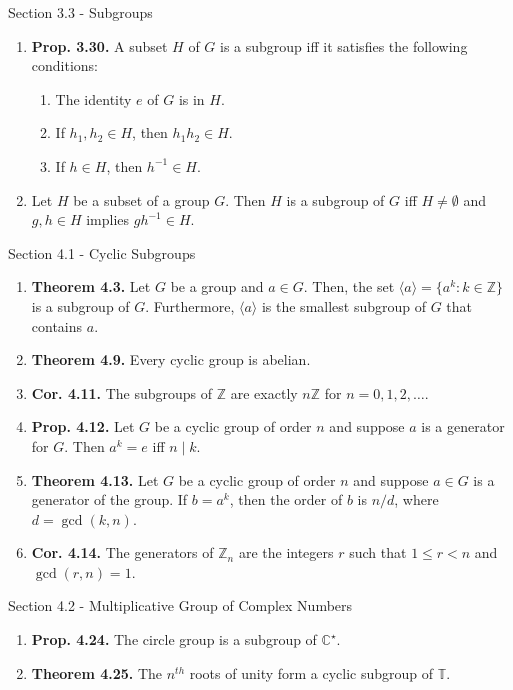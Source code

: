 \documentclass[12pt]{article}
\theoremstyle{definition}
\theoremstyle{named}
\begin{document}
\begin{section}{Section 3.3 - Subgroups}
    \begin{enumerate}
        \item \textbf{Prop. 3.30. } A subset $H$ of $G$ is a subgroup iff it satisfies the following conditions: 
        \begin{enumerate}
            \item The identity $e$ of $G$ is in $H$. 
            \item If $h_1,h_2 \in H$, then $h_1h_2 \in H$. 
            \item If $h \in H$, then $h^{-1} \in H$. 
        \end{enumerate}
        \item Let $H$ be a subset of a group $G$. Then $H$ is a subgroup of $G$ iff $H \neq \emptyset$ and $g,h \in H$ implies $gh^{-1} \in H$. 
    \end{enumerate}
\end{section}

\begin{section}{Section 4.1 - Cyclic Subgroups}
    \begin{enumerate}
        \item \textbf{Theorem 4.3. } Let $G$ be a group and $a \in G$. Then, the set $\langle a \rangle = \{a^k: k \in \mathbb{Z}\}$ is a subgroup of $G$. Furthermore, $\langle a \rangle$ is the smallest subgroup of $G$ that contains $a$. 
        \item \textbf{Theorem 4.9. } Every cyclic group is abelian. 
        \item \textbf{Cor. 4.11. } The subgroups of $\mathbb{Z}$ are exactly $n\mathbb{Z}$ for $n=0,1,2,\dots$. 
        \item \textbf{Prop. 4.12. } Let $G$ be a cyclic group of order $n$ and suppose $a$ is a generator for $G$. Then $a^k=e$ iff $n \mid k$. 
        \item \textbf{Theorem 4.13. } Let $G$ be a cyclic group of order $n$ and suppose $a \in G$ is a generator of the group. If $b = a^k$, then the order of $b$ is $n/d$, where $d = \gcd(k,n)$. 
        \item \textbf{Cor. 4.14. } The generators of $\mathbb{Z}_n$ are the integers $r$ such that $1 \leq r < n$ and $\gcd(r,n)=1$. 
    \end{enumerate}
\end{section}

\begin{section}{Section 4.2 - Multiplicative Group of Complex Numbers}
    \begin{enumerate}
        \item \textbf{Prop. 4.24. } The circle group is a subgroup of $\mathbb{C}^\star$. 
        \item \textbf{Theorem 4.25. } The $n^{th}$ roots of unity form a cyclic subgroup of $\mathbb{T}$. 
    \end{enumerate}
\end{section}
\end{document}
